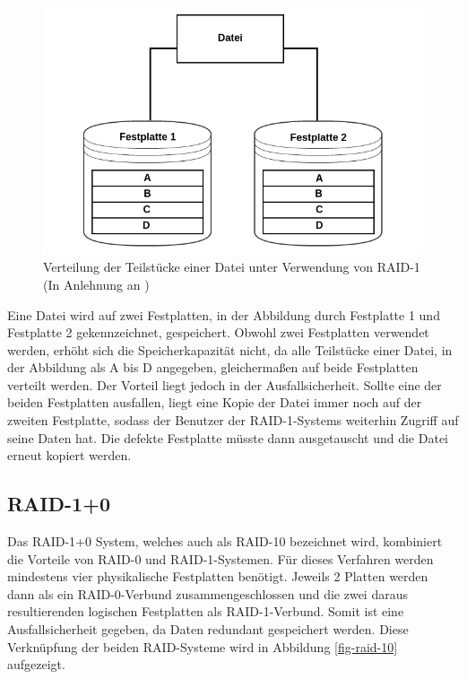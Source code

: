 \begin{figure}[H]
  \centering
  \includegraphics[scale=0.3]{resources/Bilder_Kapitel_2/RAID-1.png}
  \caption[Verteilung der Teilstücke einer Datei unter Verwendung von RAID-1]{Verteilung der Teilstücke einer Datei unter Verwendung von RAID-1 (In Anlehnung an \cite[Seite 280]{mandl08})}
  \label{fig-raid-1}
\end{figure}

Eine Datei wird auf zwei Festplatten, in der Abbildung durch Festplatte 1 und Festplatte 2 gekennzeichnet, gespeichert.
Obwohl zwei Festplatten verwendet werden, erhöht sich die Speicherkapazität nicht, da alle Teilstücke einer Datei, in der Abbildung als A bis D angegeben, gleichermaßen auf beide Festplatten verteilt werden.
Der Vorteil liegt jedoch in der Ausfallsicherheit.
Sollte eine der beiden Festplatten ausfallen, liegt eine Kopie der Datei immer noch auf der zweiten Festplatte, sodass der Benutzer der \ac{RAID}-1-Systems weiterhin Zugriff auf seine Daten hat.
Die defekte Festplatte müsste dann ausgetauscht und die Datei erneut kopiert werden.

\subsection{RAID-1+0}
Das \ac{RAID}-1+0 System, welches auch als \ac{RAID}-10 bezeichnet wird, kombiniert die Vorteile von \ac{RAID}-0 und \ac{RAID}-1-Systemen.
Für dieses Verfahren werden mindestens vier physikalische Festplatten benötigt\cite[vgl.][Seite 282]{mandl13}.
Jeweils 2 Platten werden dann als ein \ac{RAID}-0-Verbund zusammengeschlossen und die zwei daraus resultierenden logischen Festplatten als \ac{RAID}-1-Verbund\cite[vgl.][Seite 282]{mandl13}.
Somit ist eine Ausfallsicherheit gegeben, da Daten redundant gespeichert werden\cite[vgl.][Seite 282]{mandl13}.
Diese Verknüpfung der beiden \ac{RAID}-Systeme wird in Abbildung \ref{fig-raid-10} aufgezeigt.


